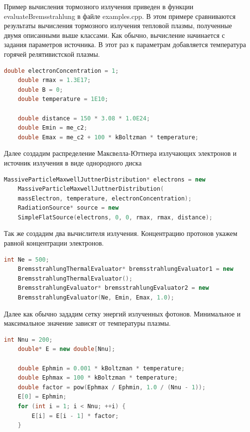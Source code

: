 Пример вычисления тормозного излучения приведен в функции evaluateBremsstrahlung в файле examples.cpp. В этом примере сравниваются результаты вычисления тормозного излучения тепловой плазмы, полученные двумя описанными выше классами. Как обычно, вычисление начинается с задания параметров источника. В этот раз к параметрам добавляется температура горячей релятивистской плазмы.

\begin{lstlisting}[language=c++]
	double electronConcentration = 1;
	double rmax = 1.3E17;
	double B = 0;
	double temperature = 1E10;
	
	double distance = 150 * 3.08 * 1.0E24;
	double Emin = me_c2;
	double Emax = me_c2 + 100 * kBoltzman * temperature;
\end{lstlisting}

Далее создадим распределение Максвелла-Юттнера излучающих электронов и источник излучения в виде однородного диска

\begin{lstlisting}[language=c++]
	MassiveParticleMaxwellJuttnerDistribution* electrons = new 
	MassiveParticleMaxwellJuttnerDistribution( 
	massElectron, temperature, electronConcentration);
	RadiationSource* source = new 
	SimpleFlatSource(electrons, 0, 0, rmax, rmax, distance);
\end{lstlisting}

Так же создадим два вычислителя излучения. Концентрацию протонов укажем равной концентрации электронов.

\begin{lstlisting}[language=c++]
	int Ne = 500;
	BremsstrahlungThermalEvaluator* bremsstrahlungEvaluator1 = new
	BremsstrahlungThermalEvaluator();
	BremsstrahlungEvaluator* bremsstrahlungEvaluator2 = new
	BremsstrahlungEvaluator(Ne, Emin, Emax, 1.0);
\end{lstlisting}

Далее как обычно зададим сетку энергий излученных фотонов. Минимальное и максимальное значение зависят от температуры плазмы.

\begin{lstlisting}[language=c++]
	int Nnu = 200;
	double* E = new double[Nnu];
	
	double Ephmin = 0.001 * kBoltzman * temperature;
	double Ephmax = 100 * kBoltzman * temperature;
	double factor = pow(Ephmax / Ephmin, 1.0 / (Nnu - 1));
	E[0] = Ephmin;
	for (int i = 1; i < Nnu; ++i) {
		E[i] = E[i - 1] * factor;
	}	
\end{lstlisting}

